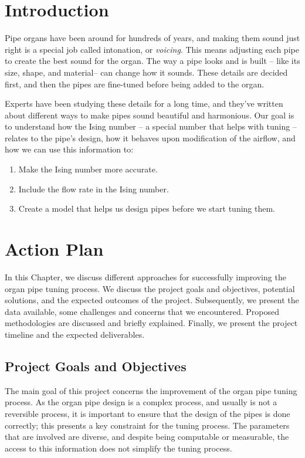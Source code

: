 \documentclass{psu-plan}
\begin{document}
\tableofcontents


\section{Introduction}

Pipe organs have been around for hundreds of years, and making them sound just
right is a special job called intonation, or \emph{voicing}.
This means adjusting each pipe to create the best sound for the organ.
The way a pipe looks and is built -- like its size, shape, and material-- can
change how it sounds.
These details are decided first, and then the pipes are fine-tuned before being
added to the organ.

Experts have been studying these details for a long time, and they’ve written
about different ways to make pipes sound beautiful and harmonious.
Our goal is to understand how the Ising number -- a special number that helps
with tuning -- relates to the pipe’s design, how it behaves upon modification of
the airflow, and how we can use this information to:
\begin{enumerate}
    \item Make the Ising number more accurate.
    \item Include the flow rate in the Ising number.
    \item Create a model that helps us design pipes before we start tuning them.
\end{enumerate}

\section{Action Plan}

In this Chapter, we discuss different approaches for successfully improving the
organ pipe tuning process.
We discuss the project goals and objectives, potential solutions, and the
expected outcomes of the project.
Subsequently, we present the data available, some challenges and concerns that
we encountered.
Proposed methodologies are discussed and briefly explained.
Finally, we present the project timeline and the expected deliverables.

\subsection{Project Goals and Objectives}

The main goal of this project concerns the improvement of the organ pipe tuning
process.
As the organ pipe design is a complex process, and usually is not a reversible
process, it is important to ensure that the design of the pipes is done
correctly; this presents a key constraint for the tuning process.
The parameters that are involved are diverse, and despite being computable or
measurable, the access to this information does not simplify the tuning process.
\end{document}
